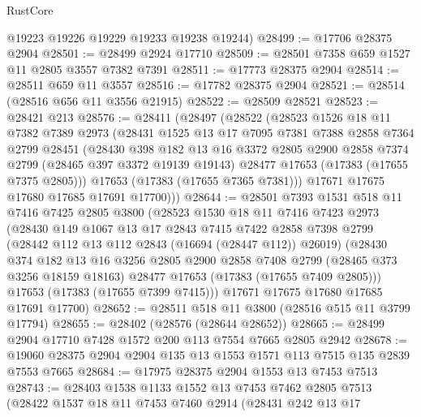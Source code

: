 \begin{lexlean}{RustCore}
\begin{coremodule}
      @19223
      @19226
      @19229
      @19233
      @19238
      @19244)
@28499 := @17706 @28375 @2904
@28501 := @28499 @2924 @17710
@28509 := @28501 @7358 @659 @1527 @11 @2805 @3557 @7382 @7391
@28511 := @17773 @28375 @2904
@28514 := @28511 @659 @11 @3557
@28516 := @17782 @28375 @2904
@28521 := @28514 (@28516 @656 @11 @3556 @21915)
@28522 := @28509 @28521
@28523 := @28421 @213
@28576 := @28411
    (@28497
      (@28522
        (@28523
          @1526
          @18
          @11
          @7382
          @7389
          @2973
          (@28431
            @1525
            @13
            @17
            @7095
            @7381
            @7388
            @2858
            @7364
            @2799
            @28451
            (@28430
              @398
              @182
              @13
              @16
              @3372
              @2805
              @2900
              @2858
              @7374
              @2799
              (@28465 @397 @3372 @19139 @19143)
              @28477
              @17653
              (@17383 (@17655 @7375 @2805)))
            @17653
            (@17383 (@17655 @7365 @7381)))
          @17671
          @17675
          @17680
          @17685
          @17691
          @17700)))
@28644 := @28501
    @7393
    @1531
    @518
    @11
    @7416
    @7425
    @2805
    @3800
    (@28523
      @1530
      @18
      @11
      @7416
      @7423
      @2973
      (@28430
        @149
        @1067
        @13
        @17
        @2843
        @7415
        @7422
        @2858
        @7398
        @2799
        (@28442 @112 @13 @112 @2843 (@16694 (@28447 @112)) @26019)
        (@28430
          @374
          @182
          @13
          @16
          @3256
          @2805
          @2900
          @2858
          @7408
          @2799
          (@28465 @373 @3256 @18159 @18163)
          @28477
          @17653
          (@17383 (@17655 @7409 @2805)))
        @17653
        (@17383 (@17655 @7399 @7415)))
      @17671
      @17675
      @17680
      @17685
      @17691
      @17700)
@28652 := @28511 @518 @11 @3800 (@28516 @515 @11 @3799 @17794)
@28655 := @28402 (@28576 (@28644 @28652))
@28665 := @28499 @2904 @17710 @7428 @1572 @200 @113 @7554 @7665 @2805 @2942
@28678 := @19060 @28375 @2904 @2904 @135 @13 @1553 @1571 @113 @7515 @135 @2839 @7553 @7665
@28684 := @17975 @28375 @2904 @1553 @13 @7453 @7513
@28743 := @28403
    @1538
    @1133
    @1552
    @13
    @7453
    @7462
    @2805
    @7513
    (@28422
      @1537
      @18
      @11
      @7453
      @7460
      @2914
      (@28431
        @242
        @13
        @17

\end{coremodule}
\end{lexlean}
